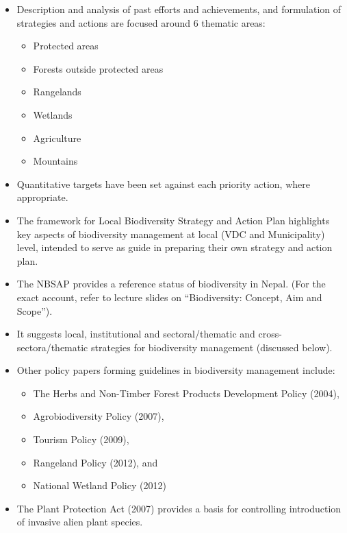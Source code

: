 \documentclass[
  ignorenonframetext,
  aspectratio=169]{beamer}
\providecommand{\tightlist}{%
  \setlength{\itemsep}{0pt}\setlength{\parskip}{0pt}}
\begin{document}
\begin{frame}{}
\protect\hypertarget{section-8}{}
\footnotesize

\begin{itemize}
\tightlist
\item
  Description and analysis of past efforts and achievements, and
  formulation of strategies and actions are focused around 6 thematic
  areas:

  \begin{itemize}
  \tightlist
  \item
    Protected areas
  \item
    Forests outside protected areas
  \item
    Rangelands
  \item
    Wetlands
  \item
    Agriculture
  \item
    Mountains
  \end{itemize}
\item
  Quantitative targets have been set against each priority action, where
  appropriate.
\item
  The framework for Local Biodiversity Strategy and Action Plan
  highlights key aspects of biodiversity management at local (VDC and
  Municipality) level, intended to serve as guide in preparing their own
  strategy and action plan.
\end{itemize}
\end{frame}

\begin{frame}{}
\protect\hypertarget{section-9}{}
\begin{itemize}
\tightlist
\item
  The NBSAP provides a reference status of biodiversity in Nepal. (For
  the exact account, refer to lecture slides on ``Biodiversity: Concept,
  Aim and Scope'').
\item
  It suggests local, institutional and sectoral/thematic and
  cross-sectora/thematic strategies for biodiversity management
  (discussed below).
\item
  Other policy papers forming guidelines in biodiversity management
  include:

  \begin{itemize}
  \tightlist
  \item
    The Herbs and Non-Timber Forest Products Development Policy (2004),
  \item
    Agrobiodiversity Policy (2007),
  \item
    Tourism Policy (2009),
  \item
    Rangeland Policy (2012), and
  \item
    National Wetland Policy (2012)
  \end{itemize}
\item
  The Plant Protection Act (2007) provides a basis for controlling
  introduction of invasive alien plant species.
\end{itemize}
\end{frame}
\end{document}

